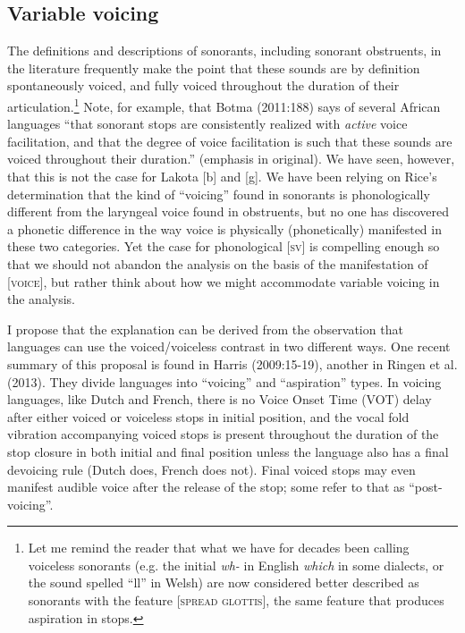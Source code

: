 \documentclass[output=paper]{LSP/langsci}
\begin{document}
\subsection{Variable voicing}

The definitions and descriptions of sonorants, including sonorant obstruents, in the literature frequently make the point that these sounds are by definition spontaneously voiced, and fully voiced throughout the duration of their articulation.\footnote{Let me remind the reader that what we have for decades been calling voiceless sonorants (e.g. the initial \textit{wh-} in English \textit{which} in some dialects, or the sound spelled ``ll'' in Welsh) are now considered better described as sonorants with the feature [\textsc{spread glottis}], the same feature that produces aspiration in stops.} Note, for example, that Botma (2011:188) says of several African languages ``that sonorant stops are consistently realized with \textit{active} voice facilitation, and that the degree of voice facilitation is such that these sounds are voiced throughout their duration.'' (emphasis in original). We have seen, however, that this is not the case for Lakota [b] and [g]. We have been relying on Rice's determination that the kind of ``voicing'' found in sonorants is phonologically different from the laryngeal voice found in obstruents, but no one has discovered a phonetic difference in the way voice is physically (phonetically) manifested in these two categories. Yet the case for phonological [\textsc{sv}] is compelling enough so that we should not abandon the analysis on the basis of the manifestation of [\textsc{voice}], but rather think about how we might accommodate variable voicing in the analysis.

I propose that the explanation can be derived from the observation that languages can use the voiced/voiceless contrast in two different ways. One recent summary of this proposal is found in Harris (2009:15-19), another in Ringen et al. (2013). They divide languages into ``voicing'' and ``aspiration'' types. In voicing languages, like Dutch and French, there is no Voice Onset Time (VOT) delay after either voiced or voiceless stops in initial position, and the vocal fold vibration accompanying voiced stops is present throughout the duration of the stop closure in both initial and final position unless the language also has a final devoicing rule (Dutch does, French does not). Final voiced stops may even manifest audible voice after the release of the stop; some refer to that as ``post-voicing''.
\end{document}
